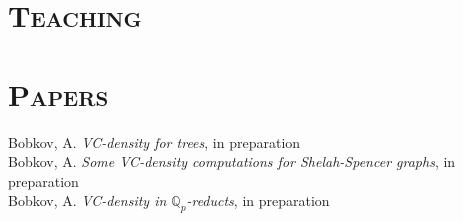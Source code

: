 \documentclass[margin, 10pt]{res} %
\begin{document}
\begin{resume}
\section{\textsc{Teaching}}




 
\section{\textsc{Papers}}

Bobkov, A. {\it VC-density for trees}, in preparation  \\
Bobkov, A. {\it Some VC-density computations for Shelah-Spencer graphs}, in preparation \\
Bobkov, A. {\it VC-density in $\mathbb{Q}_p$-reducts}, in preparation


\end{resume}
\end{document}
